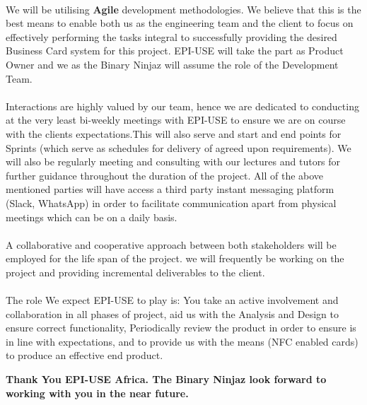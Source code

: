 \documentclass[11pt]{article}
\begin{document}
\paragraph{} We will be utilising \textbf{Agile} development methodologies. We believe that this is the best means to enable both us as the engineering team and the client to focus on effectively performing the tasks integral to successfully providing the desired Business Card system for this project. EPI-USE will take the part as Product Owner and we as the Binary Ninjaz will assume the role of the Development Team. 

\paragraph{} 
Interactions are highly valued by our team, hence we are dedicated to conducting at the very least bi-weekly meetings with EPI-USE to ensure we are on course with the clients expectations.This will also serve and start and end points for Sprints (which serve as schedules for delivery of agreed upon requirements). We will also be regularly meeting and consulting with our lectures and tutors for further guidance throughout the duration of the project. All of the above mentioned parties will have access a third party instant messaging platform (Slack, WhatsApp) in order to facilitate communication apart from physical meetings which can be on a daily basis.

\paragraph{} 
A collaborative and cooperative approach between both stakeholders will be employed for the life span of the project. we will frequently be working on the project and providing incremental deliverables to the client. \newline

\paragraph{}
The role We expect EPI-USE to play is:
\newline You take an active involvement and collaboration in all phases of project, aid us with the Analysis and Design to ensure correct functionality, Periodically review the product in order to ensure  is in line with expectations, and to provide us with the means (NFC enabled cards) to produce an effective end product.

\begin{center}
{\sffamily\bfseries
\large Thank You EPI-USE Africa. The Binary Ninjaz look forward to working with you in the near future.
}
\end{center}
\end{document}

